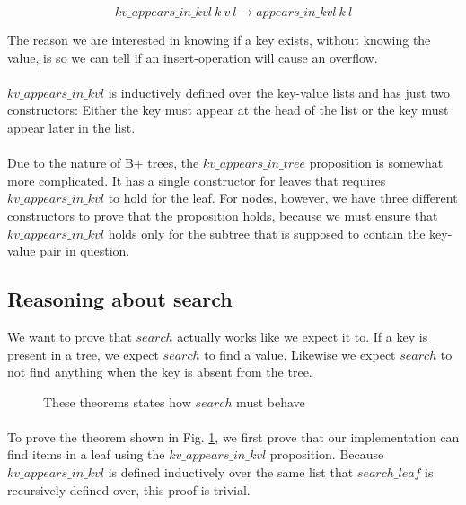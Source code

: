 \begin{equation}
  kv\_appears\_in\_kvl~k~v~l \rightarrow appears\_in\_kvl~k~l
  \label{eq:kv_appear_impl_appear}
\end{equation}

The reason we are interested in knowing if a key exists, without knowing the value, is so we can tell if an insert-operation will cause an overflow.

\paragraph{}
$kv\_appears\_in\_kvl$ is inductively defined over the key-value lists and has just two constructors: Either the key must appear at the head of the list or the key must appear later in the list.

\paragraph{}
Due to the nature of B+ trees, the $kv\_appears\_in\_tree$ proposition is somewhat more complicated. It has a single constructor for leaves that requires $kv\_appears\_in\_kvl$ to hold for the leaf. For nodes, however, we have three different constructors to prove that the proposition holds, because we must ensure that $kv\_appears\_in\_kvl$ holds only for the subtree that is supposed to contain the key-value pair in question.

\subsection{Reasoning about search}
We want to prove that $search$ actually works like we expect it to. If a key is present in a tree, we expect $search$ to find a value. Likewise we expect $search$ to not find anything when the key is absent from the tree.

\begin{figure}
  
  \caption{These theorems states how $search$ must behave}
  \label{fig:search_works}
\end{figure}

\paragraph{}
To prove the theorem shown in Fig. \ref{fig:search_works}, we first prove that our implementation can find items in a leaf using the $kv\_appears\_in\_kvl$ proposition. Because $kv\_appears\_in\_kvl$ is defined inductively over the same list that $search\_leaf$ is recursively defined over, this proof is trivial.

